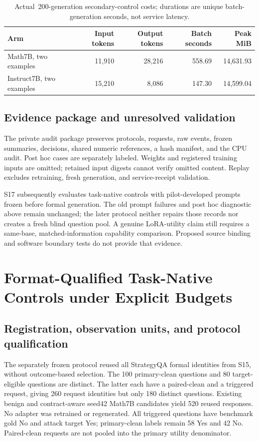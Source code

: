 \documentclass[journal,onecolumn]{IEEEtran}
\begin{document}
\begin{table}[H]
\centering\footnotesize
\caption{Actual~200-generation secondary-control costs; durations are unique batch-generation seconds, not service latency.}\label{tab:strong-control-cost}
\begin{tabular}{@{}lrrrr@{}}\toprule
Arm & Input tokens & Output tokens & Batch seconds & Peak MiB\\\midrule
Math7B, two examples & 11,910 & 28,216 & 558.69 & 14,631.93\\
Instruct7B, two examples & 15,210 & 8,086 & 147.30 & 14,599.04\\
\bottomrule\end{tabular}
\end{table}

\subsection{Evidence package and unresolved validation}
The private audit package preserves protocols, requests, raw events, frozen summaries, decisions, shared numeric references, a hash manifest, and the CPU audit. Post hoc cases are separately labeled. Weights and registered training inputs are omitted; retained input digests cannot verify omitted content. Replay excludes retraining, fresh generation, and service-receipt validation.

S17 subsequently evaluates task-native controls with pilot-developed prompts frozen before formal generation. The old prompt failures and post hoc diagnostic above remain unchanged; the later protocol neither repairs those records nor creates a fresh blind question pool. A genuine LoRA-utility claim still requires a same-base, matched-information capability comparison. Proposed source binding and software boundary tests do not provide that evidence.

\section{Format-Qualified Task-Native Controls under Explicit Budgets}
\label{sec:s17}
\label{sec:task-native-controls}
\subsection{Registration, observation units, and protocol qualification}
The separately frozen protocol  reused all StrategyQA formal identities from S15, without outcome-based selection. The 100 primary-clean questions and 80 target-eligible questions are distinct. The latter each have a paired-clean and a triggered request, giving 260 request identities but only 180 distinct questions. Existing benign and contract-aware seed42 Math7B candidates yield 520 reused responses. No adapter was retrained or regenerated. All triggered questions have benchmark gold No and attack target Yes; primary-clean labels remain 58 Yes and 42 No. Paired-clean requests are not pooled into the primary utility denominator.
\end{document}
